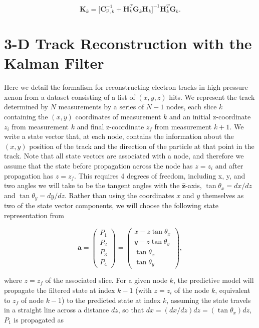 \documentclass[10pt]{article}
\begin{document}
\begin{equation}
 \mathbf{K}_{k} = \bigl[\mathbf{C}_{\mathrm{P},k}^{-1} + \mathbf{H}_{k}^{T}\mathbf{G}_{k}\mathbf{H}_{k}\bigr]^{-1}\mathbf{H}_{k}^{T}\mathbf{G}_{k}.
\end{equation}

\section{3-D Track Reconstruction with the Kalman Filter}
\noindent Here we detail the formalism for reconstructing electron tracks in high pressure xenon from a dataset consisting of a list of $(x,y,z)$ hits.
We represent the track determined by $N$ measurements by a series of $N-1$ nodes, each slice $k$ containing the $(x,y)$ coordinates of measurement $k$
and an initial z-coordinate $z_{i}$ from measurement $k$ and final z-coordinate $z_{f}$ from measurement $k+1$.  We write a state vector that, at each node,
contains the information about the $(x,y)$ position of the track and the direction of the particle at that point in the track.  Note that all state vectors
are associated with a node, and therefore we assume that the state before propagation across the node has $z = z_{i}$ and after propagation has
$z = z_{f}$.  This requires 4 degrees of freedom, including x, y, and two angles we will take to be the tangent angles with the $\mathbf{\hat{z}}$-axis,
$\tan\theta_{x} = dx/dz$ and $\tan\theta_{y} = dy/dz$.  Rather than using the coordinates $x$ and $y$ themselves as two of the state vector components,
we will choose the following state representation from \cite{Wolin_1993}

\begin{equation}\label{eqn_avector}
 \mathbf{a} = \left(\begin{array}{c} P_{1}\\ P_{2}\\ P_{3}\\ P_{4} \end{array} \right) = \left(\begin{array}{c} x - z\tan\theta_{x}\\ y - z\tan\theta_{y}\\ \tan\theta_{x}\\ \tan\theta_{y} \end{array} \right),
\end{equation}

\noindent where $z = z_{f}$ of the associated slice.  For a given node $k$, the predictive model will propagate the filtered state at index 
$k-1$ (with $z = z_{i}$ of the node $k$, equivalent to $z_{f}$ of node $k-1$) to the predicted state at index $k$, assuming the state travels
in a straight line across a distance $dz$, so that $dx = (dx/dz)dz = (\tan\theta_{x})dz$, $P_{1}$ is propagated as
\end{document}
